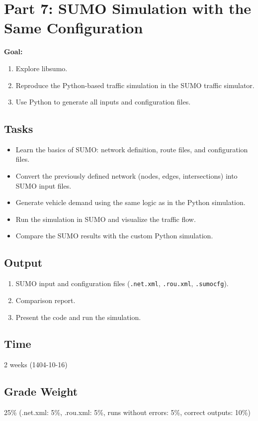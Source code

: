 \documentclass{KPS_assignment}
\begin{document}
\maketitle
\section*{Part 7: SUMO Simulation with the Same Configuration}

\textbf{Goal:}
\begin{enumerate}
\item Explore libsumo.
\item Reproduce the Python-based traffic simulation in the SUMO traffic simulator.
\item Use Python to generate all inputs and configuration files.
\end{enumerate}

\subsection*{Tasks}
\begin{itemize}
    \item Learn the basics of SUMO: network definition, route files, and configuration files.
    \item Convert the previously defined network (nodes, edges, intersections) into SUMO input files.
    \item Generate vehicle demand using the same logic as in the Python simulation.
    \item Run the simulation in SUMO and visualize the traffic flow.
    \item Compare the SUMO results with the custom Python simulation.
\end{itemize}

\subsection*{Output}
\begin{enumerate}
\item SUMO input and configuration files (\texttt{.net.xml}, \texttt{.rou.xml}, \texttt{.sumocfg}).
\item Comparison report.
\item Present the code and run the simulation.
\end{enumerate}

\subsection*{Time}
2 weeks (1404-10-16)

\subsection*{Grade Weight}
25\% (.net.xml: 5\%, .rou.xml: 5\%, runs without errors: 5\%, correct outputs: 10\%)
\end{document}
